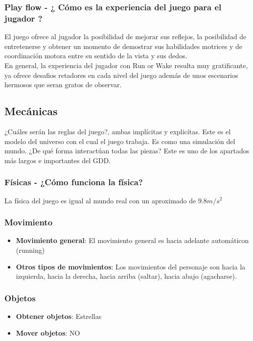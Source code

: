 \subsubsection{ Play flow - ¿ Cómo es la experiencia del juego para el jugador ?}

El juego ofrece al jugador la posibilidad de mejorar sus reflejos, la posibilidad
de entretenerse y obtener un momento de demostrar sus habilidades motrices y de 
coordinación motora entre su sentido de la vista y sus dedos.\\

En general, la experiencia del jugador con Run or Wake resulta muy gratificante, ya 
ofrece desafios retadores en cada nivel del juego además de unos escenarios hermosos
que seran gratos de observar.

\subsection{Mecánicas}
¿Cuáles serán las reglas del juego?, ambas implícitas y explicítas. Este es el modelo del 
universo con el cual el juego trabaja. Es como una simulación del mundo. ¿De qué forma interactúan
todas las piezas? Este es uno de los apartados más largos e importantes del GDD.

\subsubsection{Físicas - ¿Cómo funciona la física?}

La física del juego es igual al mundo real con un aproximado de $9.8 m/s^2 $

\subsubsection{Movimiento}
\begin{itemize}
  \item \textbf{Movimiento general}: El movimiento general es hacia adelante automáticon (running)
  \item \textbf{Otros tipos de movimientos}: Los movimientos del personaje son
    hacia la izquierda, hacia la derecha, hacia arriba (saltar), hacia abajo (agacharse).
\end{itemize}

\subsubsection{Objetos}
\begin{itemize}
  \item \textbf{Obtener objetos}: Estrellas
  \item \textbf{Mover objetos}: NO
\end{itemize}

